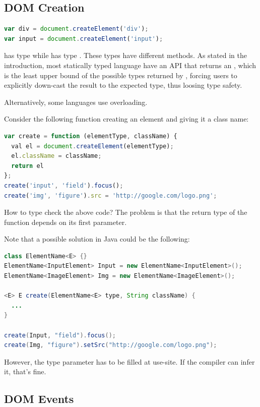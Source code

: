 \documentclass[runningheads,a4paper]{llncs}
\begin{document}
\subsection{DOM Creation}

\begin{lstlisting}[language=JavaScript]
var div = document.createElement('div');
var input = document.createElement('input');
\end{lstlisting}

 has type  while  has type . These types
have different methods. As stated in the introduction, most statically typed language have an API
that returns an , which is the least upper bound of the possible types returned by
, forcing users to explicitly down-cast the result to the expected type, thus
loosing type safety.

Alternatively, some languages use overloading.

Consider the following function creating an element and giving it a class name:

\begin{lstlisting}[language=JavaScript]
var create = function (elementType, className) {
  val el = document.createElement(elementType);
  el.className = className;
  return el
};
create('input', 'field').focus();
create('img', 'figure').src = 'http://google.com/logo.png';
\end{lstlisting}

How to type check the above code? The problem is that the return type of the  function
depends on its first parameter.

Note that a possible solution in Java could be the following:

\begin{lstlisting}[language=Java]
class ElementName<E> {}
ElementName<InputElement> Input = new ElementName<InputElement>();
ElementName<ImageElement> Img = new ElementName<ImageElement>();

<E> E create(ElementName<E> type, String className) {
  ...
}

create(Input, "field").focus();
create(Img, "figure").setSrc("http://google.com/logo.png");
\end{lstlisting}

However, the type parameter  has to be filled at use-site. If the compiler can infer it,
that’s fine.

\subsection{DOM Events}
\end{document}
